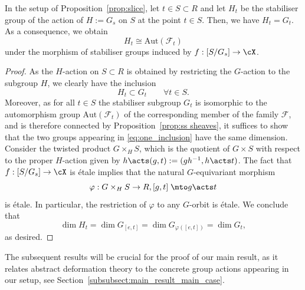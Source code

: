 \begin{cor}\label{cor:stab_preserving}
In the setup of Proposition~\ref{prop:slice}, let $t \in S \subset R$ and let $H_t$ be the stabiliser group of the action of $H := G_s$ on $S$ at the point $t\in S$. Then, we have $H_t = G_t$.
As a consequence, we obtain
\[H_t \cong \mathrm{Aut}(\mathcal{F}_t)\]
under the morphism of stabiliser groups induced by $f: [S/G_s] \to \cX$.
\end{cor}
\begin{proof}
As the $H$-action on $S \subset R$ is obtained by restricting the $G$-action to the subgroup $H$, we clearly have the inclusion
\begin{equation}\label{eq:one_inclusion}
H_t \subset G_t \quad \quad \forall t \in S.
\end{equation}
Moreover, as for all $t \in S$ the stabiliser subgroup $G_t$ is isomorphic to the automorphism group $\mathrm{Aut}(\mathcal{F}_t)$ of the corresponding member of the family $\mathcal{F}$, and is therefore connected by Proposition~\ref{prop:ss sheaves}, it suffices to show that the two groups appearing in \eqref{eq:one_inclusion} have the same dimension. Consider the twisted product $G\times_H S$, which is the quotient of $G \times S$ with respect to the proper $H$-action given by $h\acts (g, t) := (gh^{-1}, h\acts t)$. The fact that $f: [S/G_s] \to \cX$ is étale implies that the natural $G$-equivariant morphism
\[\varphi: G \times_H S \to R, [g, t]\; \mto g \acts t\]
is étale. In particular, the restriction of $\varphi$ to any $G$-orbit is étale. We conclude that
\[\dim H_t = \dim G_{[e,t]} = \dim G_{\varphi([e,t])} = \dim G_t,\]
as desired.
\end{proof}

The subsequent results will be crucial for the proof of our main result, as it relates abstract deformation theory to the concrete group actions appearing in our setup, see Section~\ref{subsubsect:main_result_main_case}.

